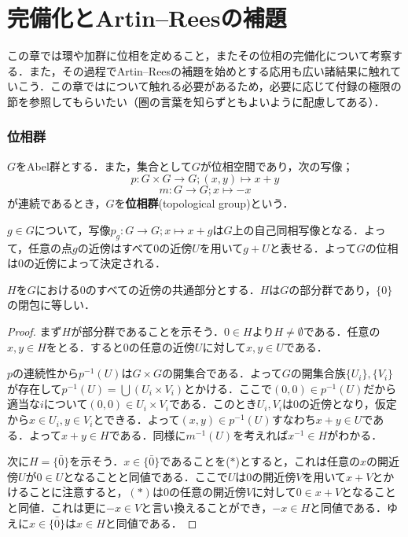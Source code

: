 \part[completion，and Artin--Rees lemma]{完備化とArtin--Reesの補題}

この章では環や加群に位相を定めること，またその位相の完備化について考察する．また，その過程でArtin--Reesの補題を始めとする応用も広い諸結果に触れていこう．この章ではについて触れる必要があるため，必要に応じて付録の極限の節を参照してもらいたい（圏の言葉を知らずともよいように配慮してある）．
\section{位相群}

\begin{defi}[位相群]
	$G$をAbel群とする．また，集合として$G$が位相空間であり，次の写像；
	\[p:G\times G\to G;(x,y)\mapsto x+y\]
	\[m:G\to G;x\mapsto -x\]
	が連続であるとき，$G$を\textbf{位相群}(topological group)という．
\end{defi}

$g\in G$について，写像$p_g:G\to G;x\mapsto x+g$は$G$上の自己同相写像となる．よって，任意の点$g$の近傍はすべて$0$の近傍$U$を用いて$g+U$と表せる．よって$G$の位相は$0$の近傍によって決定される．

\begin{prop}
	$H$を$G$における$0$のすべての近傍の共通部分とする．$H$は$G$の部分群であり，$\{0\}$の閉包に等しい．
\end{prop}

\begin{proof}
	まず$H$が部分群であることを示そう．$0\in H$より$H\neq\emptyset$である．任意の$x,y\in H$をとる．すると$0$の任意の近傍$U$に対して$x,y\in U$である．
	
	$p$の連続性から$p^{-1}(U)$は$G\times G$の開集合である．よって$G$の開集合族$\{U_i\},\{V_i\}$が存在して$p^{-1}(U)=\bigcup (U_i\times V_i)$とかける．ここで$(0,0)\in p^{-1}(U)$だから適当な$i$について$(0,0)\in U_i\times V_i$である．このとき$U_i,V_i$は$0$の近傍となり，仮定から$x\in U_i,y\in V_i$とできる．よって$(x,y)\in p^{-1}(U)$すなわち$x+y\in U$である．よって$x+y\in H$である．同様に$m^{-1}(U)$を考えれば$x^{-1}\in H$がわかる．
	
	次に$H=\bar{\{0\}}$を示そう．$x\in\bar{\{0\}}$であることを($\ast$)とすると，これは任意の$x$の開近傍$U$が$0\in U$となることと同値である．ここで$U$は$0$の開近傍$V$を用いて$x+V$とかけることに注意すると，$(\ast)$は$0$の任意の開近傍$V$に対して$0\in x+V$となることと同値．これは更に$-x\in V$と言い換えることができ，$-x\in H$と同値である．ゆえに$x\in\bar{\{0\}}$は$x\in H$と同値である．
\end{proof}

